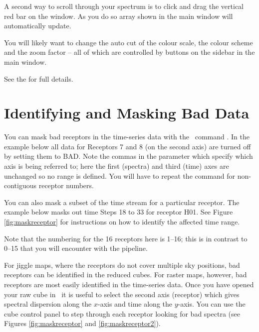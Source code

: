 \documentclass[11pt,oneside,chapters]{starlink}
\begin{document}
A second way to scroll through your spectrum is to click and drag the
vertical red bar on the  window. As you do so
array shown in the main window will automatically update.

You will likely want to change the auto cut of the colour scale, the
colour scheme and the zoom factor -- all of which are controlled by
buttons on the sidebar in the main window.

See the  for full
details.

\section{Identifying and Masking Bad Data}
\label{sec:badrecs}

You can mask bad receptors in the time-series data with the \Kappa\
command \chpix. In the example below all data for Receptors 7 and 8
(on the second axis) are turned off by setting them to BAD. Note the
commas in the \param{section} parameter which specify which axis is
being referred to; here the first (spectra) and third (time) axes are
unchanged so no range is defined. You will have to repeat the command
for non-contiguous receptor numbers.

\begin{terminalv}
\end{terminalv}
You can also mask a subset of the time stream for a particular
receptor. The example below masks out time Steps 18 to 33 for receptor
H01. See Figure \ref{fig:maskreceptor} for instructions on how to
identify the affected time range.
\begin{terminalv}
\end{terminalv}
Note that the numbering for the 16 receptors here is 1--16; this is in
contrast to 0--15 that you will encounter with the pipeline.

For jiggle maps, where the receptors do not cover multiple sky
positions, bad receptors can be identified in the reduced cubes. For
raster maps, however, bad receptors are most easily identified in the
time-series data. Once you have opened your raw cube in \gaia\ it is
useful to select the second axis (receptor) which gives spectral
dispersion along the $x$-axis and time along the $y$-axis. You can use
the cube control panel to step through each receptor looking for bad
spectra (see Figures \ref{fig:maskreceptor} and
\ref{fig:maskreceptor2}).
\end{document}
